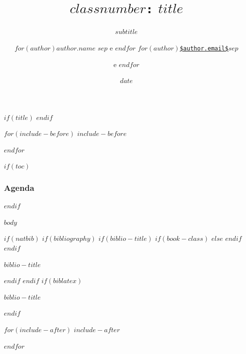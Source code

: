 \documentclass[$if(fontsize)$$fontsize$,$endif$$if(lang)$$babel-lang$,$endif$$if(handout)$handout,$endif$$if(beamer)$ignorenonframetext,$endif$$for(classoption)$$classoption$$sep$,$endfor$]{$documentclass$}
\title[$idsubjectcourseinstitution$ -- v.$version$] %
{\LARGE \texttt{$classnumber$:} $title$}
\subtitle{\Large $subtitle$}
\author[
$for(author)$\tiny $author.citation$$sep$ e $endfor$
] %
{
$for(author)$\normalsize {$author.name$}\footnotesize\inst{$author.id$}\vspace{0.05in} $sep$ e $endfor$
\vspace{-0.2cm}
\newline
$for(author)$\normalsize\href{mailto:$author.email$}{\nolinkurl{$author.email$}}$sep$ \and e $endfor$
}
\institute[]{
\normalsize
$for(author)$
\inst{$author.id$}%
\footnotesize{\vspace{-0.15cm}$author.affiliation$ \\ \vspace{-0.15cm} $author.department$ \\ \vspace{-0.15cm} $author.citystatecountry$} $sep$ \and
\vspace{-0.3cm}
$endfor$
\and
$if(coursename)$
\textbf{$coursename$}
\vspace{-0.1cm}
\\ $subjectname$
$endif$
}
\date[$date$]{$date$}
\date[\today]{}
\newif\ifbibliography
\begin{document}
$if(title)$
\frame{\vspace{1.0cm} \titlepage}
$endif$



$for(include-before)$
$include-before$

$endfor$

$if(toc)$
\begin{frame}
\frametitle{Agenda}
\tableofcontents[hideallsubsections]
\end{frame}
$endif$

$body$

$if(natbib)$
$if(bibliography)$
$if(biblio-title)$
$if(book-class)$
\renewcommand\bibname{$biblio-title$}
$else$
\renewcommand\refname{$biblio-title$}
$endif$
$endif$
\begin{frame}{$biblio-title$}
\bibliographytrue

\end{frame}

$endif$
$endif$
$if(biblatex)$
\begin{frame}{$biblio-title$}
\bibliographytrue
\printbibliography[heading=none]
\end{frame}

$endif$

$for(include-after)$
$include-after$

$endfor$
\end{document}
